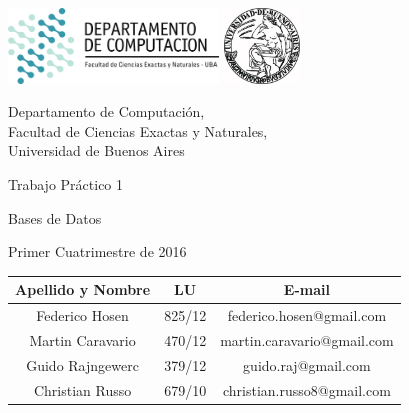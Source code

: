 \documentclass[a4paper, 10pt, twoside]{article}
\newcommand{\titulo}{Trabajo Práctico 1}
\newcommand{\materia}{Bases de Datos}
\newcommand{\cuatrimestre}{Primer Cuatrimestre de 2016}
\begin{document}


\thispagestyle{caratula}

\begin{center}

\includegraphics[height=2cm]{DC.png} 
\hfill
\includegraphics[height=2cm]{UBA.jpg} 

\vspace{2cm}

Departamento de Computación,\\
Facultad de Ciencias Exactas y Naturales,\\
Universidad de Buenos Aires

\vspace{4cm}

\begin{Huge}
\titulo
\end{Huge}

\vspace{0.5cm}

\begin{Large}
\materia
\end{Large}

\vspace{1cm}

\cuatrimestre

\vspace{4cm}

\begin{tabular}{|c|c|c|}
\hline
Apellido y Nombre & LU & E-mail\\
\hline
Federico Hosen  & 825/12 & federico.hosen@gmail.com\\
Martin Caravario  & 470/12 & martin.caravario@gmail.com\\
Guido Rajngewerc  & 379/12 & guido.raj@gmail.com\\
Christian Russo  & 679/10 & christian.russo8@gmail.com\\
\hline
\end{tabular}

\end{center}
\end{document}
